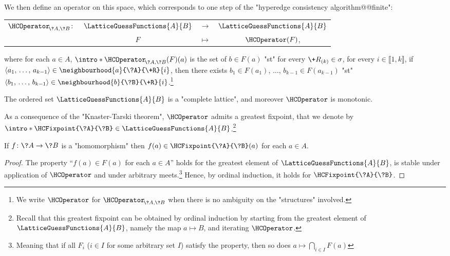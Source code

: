 We then define an operator on this space, which corresponds to one step of the "hyperedge consistency algorithm@@finite":
\begin{center}
	\begin{tabular}{rccc}
		$\HCOperator_{\!\?A,\?B}\colon$ & $\LatticeGuessFunctions{A}{B}$ & $\to$ & $\LatticeGuessFunctions{A}{B}$ \\
		& $F$ & $\mapsto$ & $\HCOperator(F)$,
	\end{tabular}
\end{center}
where for each $a \in A$, \AP$\intro*\HCOperator_{\!\?A,\?B}(F)(a)$ is the set of $b \in F(a)$ "st"
for every $\+R_{(k)} \in \sigma$, for every $i \in \lBrack 1,k\rBrack$,
if $\langle a_1,\, \hdots,\, a_{k-1} \rangle \in \neighbourhood{a}{\?A}{\+R}{i}$,
then there exists $b_1 \in F(a_1)$, $\hdots$, $b_{k-1} \in F(a_{k-1})$ "st" 
$\langle b_1,\, \hdots,\, b_{k-1} \rangle \in \neighbourhood{b}{\?B}{\+R}{i}$.\footnote{%
We write $\HCOperator$ for $\HCOperator_{\!\?A,\?B}$ when there is no ambiguity on
the "structures" involved.}

\begin{fact}
	The ordered set $\LatticeGuessFunctions{A}{B}$ is a "complete lattice",
	and moreover $\HCOperator$ is monotonic.
\end{fact}

As a consequence of the "Knaster-Tarski theorem", $\HCOperator$ admits a greatest fixpoint, that
we denote by \AP$\intro*\HCFixpoint{\?A}{\?B} \in \LatticeGuessFunctions{A}{B}$.\footnote{Recall 
that this greatest fixpoint can be obtained by ordinal induction by starting from
the greatest element of $\LatticeGuessFunctions{A}{B}$, namely the map $a \mapsto B$,
and iterating $\HCOperator$.}

\begin{proposition}
	If $f\colon \?A \to \?B$ is a "homomorphism" then $f(a) \in \HCFixpoint{\?A}{\?B}(a)$
	for each $a \in A$.
\end{proposition}

\begin{proof}
	The property ``$f(a) \in F(a)$ for each $a\in A$'' holds for the greatest element
	of $\LatticeGuessFunctions{A}{B}$, is stable under application of $\HCOperator$ and
	under arbitrary meets.\footnote{Meaning that if all $F_i$ ($i \in I$ for some arbitrary set $I$)
	satisfy the property, then so does $a \mapsto \bigcap_{i \in I} F(a)$}
	Hence, by ordinal induction, it holds for $\HCFixpoint{\?A}{\?B}$.
\end{proof}

